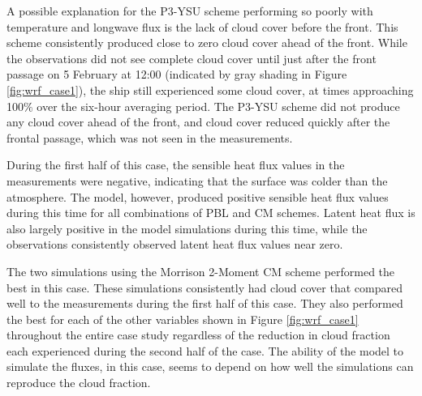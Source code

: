 A possible explanation for the P3-YSU scheme performing so poorly with temperature and longwave flux is the lack of cloud cover before the front. This scheme consistently produced close to zero cloud cover ahead of the front. While the observations did not see complete cloud cover until just after the front passage on 5 February at 12:00 (indicated by gray shading in Figure \ref{fig:wrf_case1}), the ship still experienced some cloud cover, at times approaching 100$\%$ over the six-hour averaging period. The P3-YSU scheme did not produce any cloud cover ahead of the front, and cloud cover reduced quickly after the frontal passage, which was not seen in the measurements. 

During the first half of this case, the sensible heat flux values in the measurements were negative, indicating that the surface was colder than the atmosphere. The model, however, produced positive sensible heat flux values during this time for all combinations of PBL and CM schemes. Latent heat flux is also largely positive in the model simulations during this time, while the observations consistently observed latent heat flux values near zero. 

The two simulations using the Morrison 2-Moment CM scheme performed the best in this case. These simulations consistently had cloud cover that compared well to the measurements during the first half of this case. They also performed the best for each of the other variables shown in Figure \ref{fig:wrf_case1} throughout the entire case study regardless of the reduction in cloud fraction each experienced during the second half of the case. The ability of the model to simulate the fluxes, in this case, seems to depend on how well the simulations can reproduce the cloud fraction.


